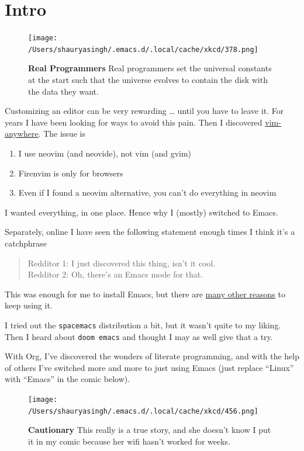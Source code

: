\documentclass{scrartcl}
\begin{document}
\section{Intro}
\label{sec:org5fdc173}
\begin{figure}[!htb]
	  \centering
	  \texttt{[image: /Users/shauryasingh/.emacs.d/.local/cache/xkcd/378.png]}
  \caption*{\label{xkcd:378} \textbf{Real Programmers} Real programmers set the universal constants at the start such that the universe evolves to contain the disk with the data they want.}
	\end{figure}

Customizing an editor can be very rewarding \ldots{} until you have to leave it.
For years I have been looking for ways to avoid this pain.
Then I discovered \href{https://github.com/cknadler/vim-anywhere}{vim-anywhere}. The issue is

\begin{enumerate}
\item I use neovim (and neovide), not vim (and gvim)
\item Firenvim is only for browsers
\item Even if I found a neovim alternative, you can't do everything in neovim
\end{enumerate}

I wanted everything, in one place. Hence why I (mostly) switched to Emacs.

Separately, online I have seen the following statement enough times I think it's a catchphrase
\begin{quote}
Redditor 1: I just discovered this thing, isn't it cool. \\
Redditor 2: Oh, there's an Emacs mode for that.
\end{quote}

This was enough for me to install Emacs, but there are
\href{https://github.com/remacs/remacs\#why-emacs}{many other reasons} to keep using it.

I tried out the \texttt{spacemacs} distribution a bit, but it wasn't quite to my liking.
Then I heard about \texttt{doom emacs} and thought I may as well give that a try.

With Org, I've discovered the wonders of literate programming, and with the help
of others I've switched more and more to just using Emacs (just replace
``Linux'' with ``Emacs'' in the comic below).

\begin{figure}[!htb]
	  \centering
	  \texttt{[image: /Users/shauryasingh/.emacs.d/.local/cache/xkcd/456.png]}
  \caption*{\label{xkcd:456} \textbf{Cautionary} This really is a true story, and she doesn't know I put it in my comic because her wifi hasn't worked for weeks.}
	\end{figure}
\end{document}
